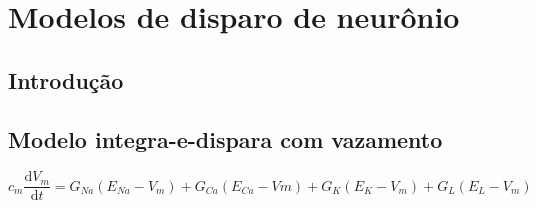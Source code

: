 \chapter{Modelos de disparo de neurônio}\label{cap:modelos}
\section{Introdução}\label{sec:modelos_intro}

\section{Modelo integra-e-dispara com vazamento}\label{sec:modelolif}
\cite{lapicque_recherches_1907}

\begin{equation}
c_m\frac{\mathrm{d}V_m}{\mathrm{d}t}=G_{Na}(E_{Na}-V_m)+G_{Ca}(E_{Ca}-Vm)+G_K(E_K-V_m)+G_L(E_L-V_m)
\end{equation}

